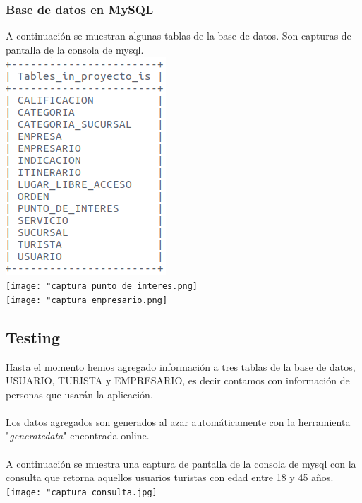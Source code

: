 \documentclass[12pt]{article}
\begin{document}
\subsubsection{Base de datos en MySQL}
A continuación se muestran algunas tablas de la base de datos. Son capturas de pantalla de la consola de mysql.\\
\includegraphics[scale=0.5]{captura1.png}\\ \texttt{[image: "captura punto de interes.png]}\\
\texttt{[image: "captura empresario.png]}
\subsection{Testing}
Hasta el momento hemos agregado información a tres tablas de la base de datos, USUARIO, TURISTA y EMPRESARIO, es decir contamos con información de personas que usarán la aplicación.\\\\
Los datos agregados son generados al azar automáticamente con la herramienta "\emph{generatedata}" encontrada online.\\\\
A continuación se muestra una captura de pantalla de la consola de mysql con la consulta que retorna aquellos usuarios turistas con edad entre 18 y 45 años.\\
\texttt{[image: "captura consulta.jpg]}
\end{document}
